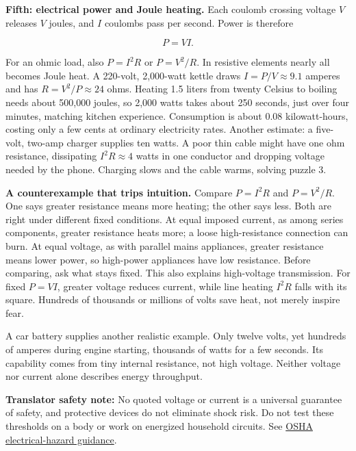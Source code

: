 \textbf{Fifth: electrical power and Joule heating.} Each coulomb crossing voltage \(V\) releases \(V\) joules, and \(I\) coulombs pass per second. Power is therefore

\[
P=VI.
\]

For an ohmic load, also \(P=I^{2}R\) or \(P=V^{2}/R\). In resistive elements nearly all becomes Joule heat. A 220-volt, 2,000-watt kettle draws \(I=P/V\approx9.1\) amperes and has \(R=V^{2}/P\approx24\) ohms. Heating 1.5 liters from twenty Celsius to boiling needs about 500,000 joules, so 2,000 watts takes about 250 seconds, just over four minutes, matching kitchen experience. Consumption is about 0.08 kilowatt-hours, costing only a few cents at ordinary electricity rates. Another estimate: a five-volt, two-amp charger supplies ten watts. A poor thin cable might have one ohm resistance, dissipating \(I^{2}R\approx4\) watts in one conductor and dropping voltage needed by the phone. Charging slows and the cable warms, solving puzzle 3.

\textbf{A counterexample that trips intuition.} Compare \(P=I^{2}R\) and \(P=V^{2}/R\). One says greater resistance means more heating; the other says less. Both are right under different fixed conditions. At equal imposed current, as among series components, greater resistance heats more; a loose high-resistance connection can burn. At equal voltage, as with parallel mains appliances, greater resistance means lower power, so high-power appliances have low resistance. Before comparing, ask what stays fixed. This also explains high-voltage transmission. For fixed \(P=VI\), greater voltage reduces current, while line heating \(I^{2}R\) falls with its square. Hundreds of thousands or millions of volts save heat, not merely inspire fear.

A car battery supplies another realistic example. Only twelve volts, yet hundreds of amperes during engine starting, thousands of watts for a few seconds. Its capability comes from tiny internal resistance, not high voltage. Neither voltage nor current alone describes energy throughput.

\textbf{Translator safety note:} No quoted voltage or current is a universal guarantee of safety, and protective devices do not eliminate shock risk. Do not test these thresholds on a body or work on energized household circuits. See \href{https://www.osha.gov/etools/poultry-processing/plant-wide-hazards/electrical-hazards}{OSHA electrical-hazard guidance}.

